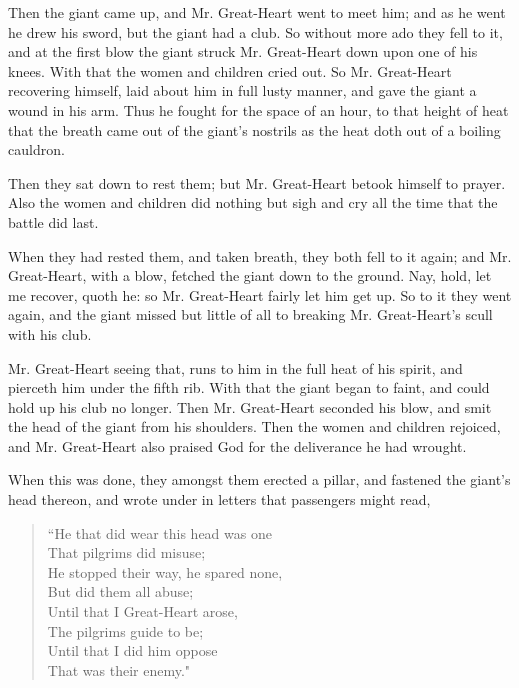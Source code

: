 Then the giant came up, and Mr. Great-Heart went to meet him; and as he went he drew his sword, but the giant had a club. So without more ado they fell to it, and at the first blow the giant struck Mr. Great-Heart down upon one of his knees. With that the women and children cried out. So Mr. Great-Heart recovering himself, laid about him in full lusty manner, and gave the giant a wound in his arm. Thus he fought for the space of an hour, to that height of heat that the breath came out of the giant's nostrils as the heat doth out of a boiling cauldron.

Then they sat down to rest them; but Mr. Great-Heart betook himself to prayer. Also the women and children did nothing but sigh and cry all the time that the battle did last.

When they had rested them, and taken breath, they both fell to it again; and Mr. Great-Heart, with a blow, fetched the giant down to the ground. Nay, hold, let me recover, quoth he: so Mr. Great-Heart fairly let him get up. So to it they went again, and the giant missed but little of all to breaking Mr. Great-Heart's scull with his club.

Mr. Great-Heart seeing that, runs to him in the full heat of his spirit, and pierceth him under the fifth rib. With that the giant began to faint, and could hold up his club no longer. Then Mr. Great-Heart seconded his blow, and smit the head of the giant from his shoulders. Then the women and children rejoiced, and Mr. Great-Heart also praised God for the deliverance he had wrought.

When this was done, they amongst them erected a pillar, and fastened the giant's head thereon, and wrote under in letters that passengers might read,
\begin{verse}
 ``He that did wear this head was one\\
That pilgrims did misuse;\\
He stopped their way, he spared none,\\
But did them all abuse;\\
Until that I Great-Heart arose,\\
The pilgrims guide to be;\\
Until that I did him oppose\\
That was their enemy." \\
\end{verse}
